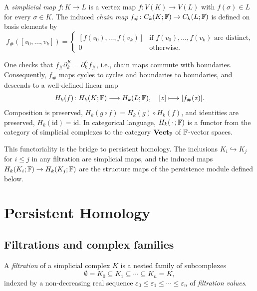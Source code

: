 \begin{definition}
\label{def:simplicial-map}
A \emph{simplicial map} $f\colon K\to L$ is a vertex map $f\colon V(K)\to V(L)$ with $f(\sigma)\in L$ for every $\sigma\in K$. The induced \emph{chain map} $f_\#\colon C_k(K;\mathbb{F})\to C_k(L;\mathbb{F})$ is defined on basis elements by
\[
  f_\#([v_0,\ldots,v_k])=
  \begin{cases}
    [f(v_0),\ldots,f(v_k)] & \text{if } f(v_0),\ldots,f(v_k)\text{ are distinct,}\\
    0 & \text{otherwise.}
  \end{cases}
\]
\end{definition}

One checks that $f_\#\partial_k^K=\partial_k^L f_\#$, i.e., chain maps commute with boundaries. Consequently, $f_\#$ maps cycles to cycles and boundaries to boundaries, and descends to a well-defined linear map
\[
  H_k(f)\colon H_k(K;\mathbb{F})\longrightarrow H_k(L;\mathbb{F}),\quad [z]\longmapsto[f_\#(z)].
\]
Composition is preserved, $H_k(g\circ f)=H_k(g)\circ H_k(f)$, and identities are preserved, $H_k(\mathrm{id})=\mathrm{id}$. In categorical language, $H_k(\,\cdot\,;\mathbb{F})$ is a functor from the category of simplicial complexes to the category $\mathbf{Vect}_{\mathbb{F}}$ of $\mathbb{F}$-vector spaces.

This functoriality is the bridge to persistent homology. The inclusions $K_i\hookrightarrow K_j$ for $i\leq j$ in any filtration are simplicial maps, and the induced maps $H_k(K_i;\mathbb{F})\to H_k(K_j;\mathbb{F})$ are the structure maps of the persistence module defined below.

\section{Persistent Homology}
\label{subsec:ph}

\subsection{Filtrations and complex families}
\label{subsubsec:filtration}

\begin{definition}[Filtration]
\label{def:filtration}
A \emph{filtration} of a simplicial complex $K$ is a nested family of subcomplexes
\[
  \emptyset=K_0\subseteq K_1\subseteq\cdots\subseteq K_n=K,
\]
indexed by a non-decreasing real sequence $\varepsilon_0\leq\varepsilon_1\leq\cdots\leq\varepsilon_n$ of \emph{filtration values}.
\end{definition}

